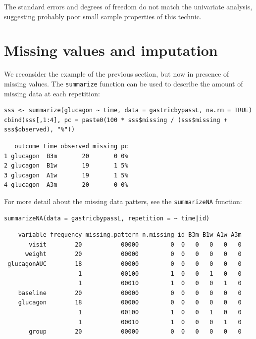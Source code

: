 \documentclass[12pt]{article}
\begin{document}
The standard errors and degrees of freedom do not match the univariate
analysis, suggesting probably poor small sample properties of this
technic.

\clearpage

\section{Missing values and imputation}
\label{sec:orgb6e8a5e}

We reconsider the example of the previous section, but now in presence
of missing values. The \texttt{summarize} function can be used to describe
the amount of missing data at each repetition:
\lstset{language=r,label= ,caption= ,captionpos=b,numbers=none}
\begin{lstlisting}
sss <- summarize(glucagon ~ time, data = gastricbypassL, na.rm = TRUE)
cbind(sss[,1:4], pc = paste0(100 * sss$missing / (sss$missing + sss$observed), "%"))
\end{lstlisting}

\begin{verbatim}
   outcome time observed missing pc
1 glucagon  B3m       20       0 0%
2 glucagon  B1w       19       1 5%
3 glucagon  A1w       19       1 5%
4 glucagon  A3m       20       0 0%
\end{verbatim}


For more detail about the missing data patters, see the \texttt{summarizeNA}
function:
\lstset{language=r,label= ,caption= ,captionpos=b,numbers=none}
\begin{lstlisting}
summarizeNA(data = gastricbypassL, repetition = ~ time|id)
\end{lstlisting}

\begin{verbatim}
    variable frequency missing.pattern n.missing id B3m B1w A1w A3m
       visit        20           00000         0  0   0   0   0   0
      weight        20           00000         0  0   0   0   0   0
 glucagonAUC        18           00000         0  0   0   0   0   0
                     1           00100         1  0   0   1   0   0
                     1           00010         1  0   0   0   1   0
    baseline        20           00000         0  0   0   0   0   0
    glucagon        18           00000         0  0   0   0   0   0
                     1           00100         1  0   0   1   0   0
                     1           00010         1  0   0   0   1   0
       group        20           00000         0  0   0   0   0   0
\end{verbatim}
\end{document}
